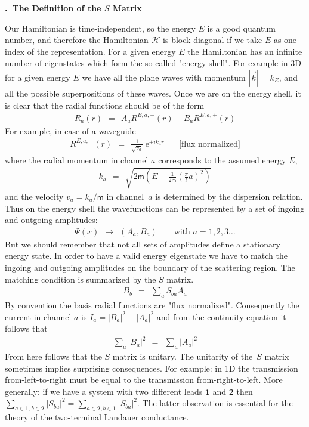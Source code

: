 \documentclass[onecolumn,fleqn, 11pt]{revtex4}
\newcommand{\eexp}{\mathrm{e}^}
\newcommand{\mass}{\mathsf{m}}
\newcommand{\beq}{\begin{eqnarray}}
\newcommand{\eeq}{\end{eqnarray}}
\renewcommand{\thesubsection}{\arabic{subsection}}
\renewcommand{\thesubsubsection}{\arabic{subsubsection}}
\newcommand{\sheadC}[1]
{
\addtocounter{subsubsection}{1}
\vspace{5mm}
{\bf \thesubsection.\thesubsubsection \ #1}  
\nopagebreak
\phantomsection
}
\begin{document}
\sheadC{The Definition of the $S$ Matrix}

Our Hamiltonian is time-independent, so the energy $E$ 
is a good quantum number, and therefore 
the Hamiltonian $\mathcal{H}$ is block diagonal 
if we take $E$ as one index of the representation. 
For a given energy $E$ the Hamiltonian has 
an infinite number of eigenstates which form 
the so called "energy shell". 
For example in 3D for a given 
energy $E$ we have all the plane waves 
with momentum $|\vec{k}|=k_E$, and all the 
possible superpositions of these waves.    
Once we are on the energy shell, 
it is clear that the radial functions 
should be of the form
\beq
R_a(r) \ \ = \ \ A_a R^{E,a,-}(r) - B_a R^{E,a,+}(r)
\eeq
For example, in case of a waveguide
\beq
R^{E,a,\pm}(r) \ \ = \ \ \frac{1}{\sqrt{v_a}} \ \eexp{\pm i k_a r}
\ \ \ \ \ \ \ \ \mbox{[flux normalized]}
\eeq
where the radial momentum in channel $a$ 
corresponds to the assumed energy $E$,  
\beq
k_a \ \ = \ \ \sqrt{2\mass\left(E-\frac{1}{2\mass}\left(\frac{\pi}{\ell}a\right)^2\right)}
\eeq
and the velocity $v_a=k_a/\mass$  in channel~$a$ 
is determined by the dispersion relation. 
Thus on the energy shell the wavefunctions 
can be represented by a set of ingoing and outgoing amplitudes:
\beq
\Psi(x) \ \ \longmapsto \ \ (A_a,B_a)
\ \ \ \ \ \ \ \ \ \mbox{with $a=1,2,3 \dots $}
\eeq
But we should remember that not all sets of amplitudes 
define a stationary energy state. In order to have 
a valid energy eigenstate we have to match 
the ingoing and outgoing amplitudes on the 
boundary of the scattering region. The matching 
condition is summarized by the $S$ matrix.
\beq
B_b \ \ = \ \ \sum_a S_{ba} A_a
\eeq
By convention the basis radial functions are "flux normalized".
Consequently  the current in channel $a$ is  $I_a = |B_a|^2-|A_a|^2$ 
and from the continuity equation it follows that 
\beq
\sum_a |B_a|^2 \ \ = \ \ \sum_a |A_a|^2
\eeq
From here follows that the $S$ matrix is unitary. 
The unitarity of the~$S$ matrix sometimes implies 
surprising consequences. For example: in 1D the 
transmission from-left-to-right must be equal 
to the transmission from-right-to-left. 
More generally: if we have a system with two 
different leads $\bm{1}$ and $\bm{2}$ 
then ${\sum_{a\in\bm{1},b\in\bm{2}} |S_{ba}|^2 =\sum_{a\in\bm{2},b\in\bm{1}} |S_{ba}|^2}$. 
The latter observation is essential 
for the theory of the two-terminal Landauer conductance. 
\end{document}
